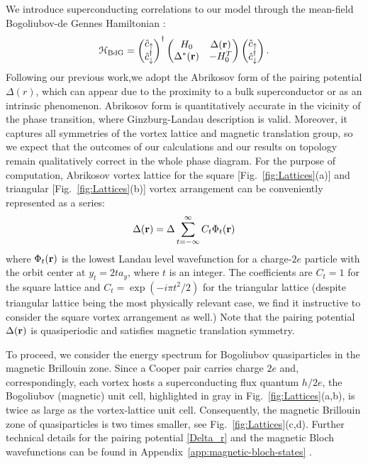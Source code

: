 \documentclass[10pt,prb,aps,superscriptaddress,amsmath,amssymb,twocolumn,floatfix,longbibliography]{revtex4-1}
\newcommand{\be}{\begin{equation} }
\newcommand{\ee}{\end{equation}}
\newcommand{\br}{{\bf r}}
\newcommand{\Hbdg}{\mathcal{H}_{\text{BdG}}}
\begin{document}
We introduce superconducting correlations to our model through the mean-field Bogoliubov-de Gennes Hamiltonian \cite{Bogoliubov, deGennes_book}:
\be \label{BdG}
	\Hbdg = 
	\begin{pmatrix}
		\hat{c}_{\uparrow} \\ \hat{c}_{\downarrow}^\dagger
	\end{pmatrix}^{\dagger}
	 \begin{pmatrix}
		H_0 & \Delta (\br) \\
		\Delta^*(\br) & -H_0^T
	\end{pmatrix}
	\begin{pmatrix}
		\hat{c}_{\uparrow} \\ \hat{c}_{\downarrow}^\dagger
	\end{pmatrix}.
\ee
Following our previous work\cite{MakingSwaveTopological},we adopt the Abrikosov form of the pairing potential $\Delta(r)$\cite{Abrikosov_vortex_lattice}, which can appear due to the proximity to a bulk superconductor or as an intrinsic phenomenon. Abrikosov form is quantitatively accurate in the vicinity of the phase transition, where Ginzburg-Landau description is valid. Moreover, it captures all symmetries of the vortex lattice and magnetic translation group, so we expect that the outcomes of our calculations and our results on topology remain qualitatively correct in the whole phase diagram. For the purpose of computation, Abrikosov vortex lattice for the square [Fig.~\ref{fig:Lattices}(a)] and triangular [Fig.~\ref{fig:Lattices}(b)] vortex arrangement can be conveniently represented as a series:
\be \label{Delta_r}
	 \Delta(\br) = \Delta \sum_{t=-\infty}^{\infty} C_t
     \Phi_t (\br)
\ee
where $\Phi_t (\br)$ is the lowest Landau level wavefunction for a charge-$2e$ particle with the orbit center at $y_t = 2 t a_y$, where $t$ is an integer.
The coefficients are $C_t = 1$ for the square lattice and $C_t = \exp (-i \pi t^2 / 2)$ for the triangular lattice (despite triangular lattice being the most physically relevant case, we find it instructive to consider the square vortex arrangement as well.) Note that the pairing potential $\Delta(\br)$ is quasiperiodic and satisfies magnetic translation symmetry.

To proceed, we consider the energy spectrum for Bogoliubov quasiparticles in the magnetic Brillouin zone.  Since a Cooper pair carries charge $2e$ and, correspondingly, each vortex hosts a superconducting flux quantum $h/2e$, the Bogoliubov (magnetic) unit cell, highlighted in gray in Fig.~\ref{fig:Lattices}(a,b), is twice as large as the vortex-lattice unit cell\cite{Franz-Tesanovic, Liu-Franz}. Consequently, the magnetic Brillouin zone of quasiparticles is two times smaller, see Fig.~\ref{fig:Lattices}(c,d). Further technical details for the pairing potential \eqref{Delta_r} and the magnetic Bloch wavefunctions can be found in Appendix~\ref{app:magnetic-bloch-states} \cite{DukanTesanovic, TesanovicSacramento, McDonald4}.
\end{document}
